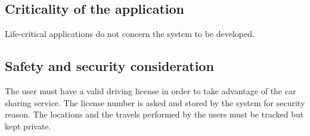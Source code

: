 \subsection{Criticality of the application}
Life-critical applications do not concern the system to be developed.

\subsection{Safety and security consideration}
The user must have a valid driving license in order to take advantage of the car sharing service. The license number is asked and stored by the system for security reason. The locations and the travels performed by the users must be tracked but kept private.